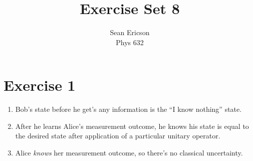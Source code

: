 \documentclass[12pt]{article}
\begin{document}
	
\title{Exercise Set 8}
\author{Sean Ericson \\ Phys 632}
\maketitle

\section*{Exercise 1}
\begin{enumerate}[label=(\alph*)]
    \item Bob's state before he get's any information is the ``I know nothing'' state.
    \item After he learns Alice's measurement outcome, he knows his state is equal to the desired state after application of a particular unitary operator.
    \item Alice \textit{knows} her measurement outcome, so there's no classical uncertainty.
\end{enumerate}
\end{document}

